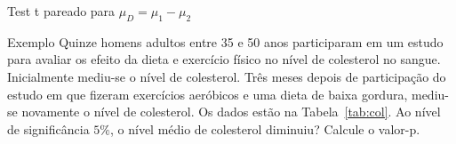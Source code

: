 \documentclass[9pt]{beamer}
\begin{document}
\begin{frame}{Test t pareado para $\mu_D = \mu_1 - \mu_2$}
	\begin{block}{Exemplo}
		Quinze homens adultos entre 35 e 50 anos participaram em um estudo para avaliar os efeito da dieta e exercício físico no nível de colesterol no sangue. Inicialmente mediu-se o nível de colesterol. Três meses depois de participação do estudo em que fizeram exercícios aeróbicos e uma dieta de baixa gordura,  mediu-se novamente o nível de colesterol. Os dados estão na Tabela~\ref{tab:col}. Ao nível de significância $5\%$, o nível médio de colesterol diminuiu? Calcule o valor-p.
	\end{block}

\begin{table}[ht]
	\centering
	\caption{Nível de colesterol.} 
	\label{tab:col}
\end{table}
\end{frame}
\end{document}
